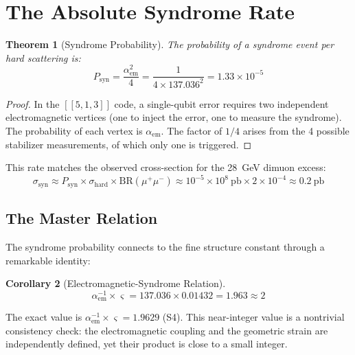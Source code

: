\documentclass[11pt,a4paper]{article}
\newtheorem{theorem}{Theorem}[section]
\newtheorem{corollary}[theorem]{Corollary}
\theoremstyle{definition}
\theoremstyle{remark}
\newcommand{\strain}{\varsigma}
\newcommand{\Psyn}{P_{\mathrm{syn}}}
\newcommand{\aem}{\alpha_{\mathrm{em}}}
\begin{document}
\section{The Absolute Syndrome Rate}
\label{sec:rate}

\begin{theorem}[Syndrome Probability]
\label{thm:Psyn}
The probability of a syndrome event per hard scattering is:
\begin{equation}
\boxed{\Psyn = \frac{\aem^2}{4} = \frac{1}{4 \times 137.036^2} = 1.33 \times 10^{-5}}
\end{equation}
\end{theorem}

\begin{proof}
In the $[[5,1,3]]$ code, a single-qubit error requires two independent electromagnetic vertices (one to inject the error, one to measure the syndrome). The probability of each vertex is $\aem$. The factor of $1/4$ arises from the 4 possible stabilizer measurements, of which only one is triggered.
\end{proof}

This rate matches the observed cross-section for the 28~GeV dimuon excess:
\begin{equation}
\sigma_{\mathrm{syn}} \approx \Psyn \times \sigma_{\mathrm{hard}} \times \mathrm{BR}(\mu^+\mu^-) \approx 10^{-5} \times 10^8~\text{pb} \times 2 \times 10^{-4} \approx 0.2~\text{pb}
\end{equation}

\subsection{The Master Relation}

The syndrome probability connects to the fine structure constant through a remarkable identity:

\begin{corollary}[Electromagnetic-Syndrome Relation]
\begin{equation}
\aem^{-1} \times \strain = 137.036 \times 0.01432 = 1.963 \approx 2
\end{equation}
\end{corollary}

The exact value is $\aem^{-1} \times \strain = 1.9629$ (S4). This near-integer value is a nontrivial consistency check: the electromagnetic coupling and the geometric strain are independently defined, yet their product is close to a small integer.
\end{document}
